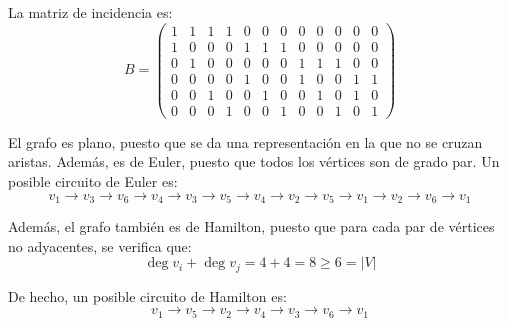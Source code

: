 \begin{ejercicio}
    La matriz de incidencia es:
    \[
        B=\left(\begin{array}{cccccccccccc}
            1 & 1 & 1 & 1 & 0 & 0 & 0 & 0 & 0 & 0 & 0 & 0 \\
            1 & 0 & 0 & 0 & 1 & 1 & 1 & 0 & 0 & 0 & 0 & 0 \\
            0 & 1 & 0 & 0 & 0 & 0 & 0 & 1 & 1 & 1 & 0 & 0 \\
            0 & 0 & 0 & 0 & 1 & 0 & 0 & 1 & 0 & 0 & 1 & 1 \\
            0 & 0 & 1 & 0 & 0 & 1 & 0 & 0 & 1 & 0 & 1 & 0 \\
            0 & 0 & 0 & 1 & 0 & 0 & 1 & 0 & 0 & 1 & 0 & 1
        \end{array}\right)
    \]

    El grafo es plano, puesto que se da una representación en la que no se cruzan aristas. Además, es de Euler, puesto que todos los vértices son de grado par. Un posible circuito de Euler es:
    \begin{equation*}
        v_1\to v_3\to v_6\to v_4\to v_3\to v_5\to v_4\to v_2\to v_5\to v_1\to v_2\to v_6\to v_1
    \end{equation*}

    Además, el grafo también es de Hamilton, puesto que para cada par de vértices no adyacentes, se verifica que:
    \begin{equation*}
        \deg v_i + \deg v_j = 4 + 4 = 8 \geq 6=|V|
    \end{equation*}

    De hecho, un posible circuito de Hamilton es:
    \begin{equation*}
        v_1\to v_5\to v_2\to v_4\to v_3\to v_6\to v_1
    \end{equation*}
\end{ejercicio}


